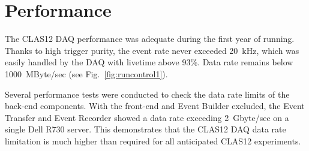 \section{Performance}

The CLAS12 DAQ performance was adequate during the first year of running. Thanks to high trigger purity, the event rate never exceeded 20~kHz, which was easily handled by the DAQ with livetime above 93\%. Data rate remains below 1000~MByte/sec (see Fig.~\ref{fig:runcontrol1}).

Several performance tests were conducted to check the data rate limits of the back-end components. With the front-end and Event Builder excluded, the Event Transfer and Event Recorder showed a data rate exceeding 2~Gbyte/sec on a single Dell R730 server. This demonstrates that the CLAS12 DAQ data rate limitation is much higher than required for all anticipated CLAS12 experiments.

